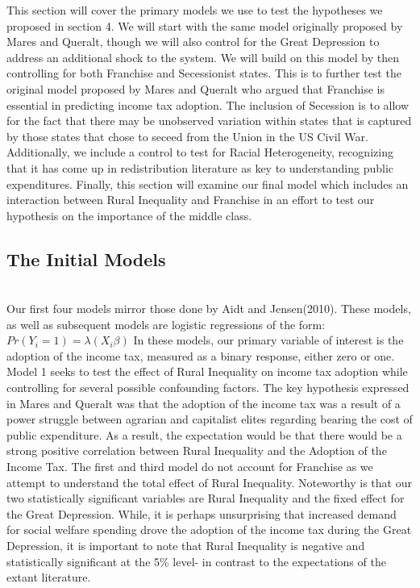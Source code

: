 \documentclass[letter, 12pt]{article}
\begin{document}
This section will cover the primary models we use to test the hypotheses we proposed in section 4. We will start with the same model originally proposed by Mares and Queralt, though we will also control for the Great Depression to address an additional shock to the system. We will build on this model by then controlling for both Franchise and Secessionist states. This is to further test the original model proposed by Mares and Queralt who argued that Franchise is essential in predicting income tax adoption. The inclusion of Secession is to allow for the fact that there may be unobserved variation within states that is captured by those states that chose to seceed from the Union in the US Civil War. Additionally, we include a control to test for Racial Heterogeneity, recognizing that it has come up in redistribution literature as key to understanding public expenditures. Finally, this section will examine our final model which includes an interaction between Rural Inequality and Franchise in an effort to test our hypothesis on the importance of the middle class.

\subsection{The Initial Models}\hfill\\

Our first four models mirror those done by Aidt and Jensen(2010). These models, as well as subsequent models are logistic regressions of the form:
$Pr(Y_i=1) = \lambda (X_i\beta)$
In these models, our primary variable of interest is the adoption of the income tax, measured as a binary response, either zero or one. Model 1 seeks to test the effect of Rural Inequality on income tax adoption while controlling for several possible confounding factors. The key hypothesis expressed in Mares and Queralt was that the adoption of the income tax was a result of a power struggle between agrarian and capitalist elites regarding bearing the cost of public expenditure. As a result, the expectation would be that there would be a strong positive correlation between Rural Inequality and the Adoption of the Income Tax. The first and third model do not account for Franchise as we attempt to understand the total effect of Rural Inequality. Noteworthy is that our two statistically significant variables are Rural Inequality and the fixed effect for the Great Depression. While, it is perhaps unsurprising that increased demand for social welfare spending drove the adoption of the income tax during the Great Depression, it is important to note that Rural Inequality is negative and statistically significant at the 5\% level- in contrast to the expectations of the extant literature. 
\end{document}
